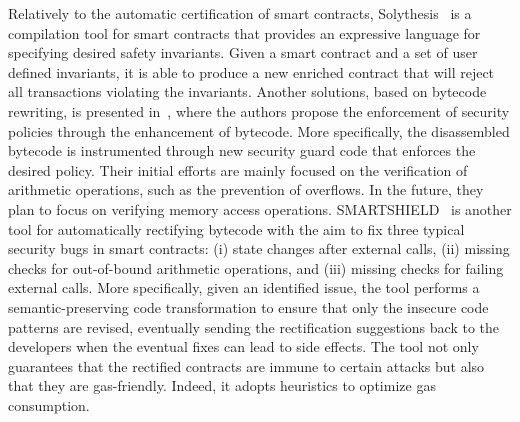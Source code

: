 Relatively to the automatic certification of smart contracts,
Solythesis~\cite{solythesis_solidity_validation} is a compilation tool for smart contracts
that provides an expressive language for specifying desired safety invariants.
Given a smart contract and a set of user defined invariants,
it is able to produce a new enriched contract that will reject all transactions
violating the invariants.
%
Another solutions, based on bytecode rewriting, is presented in~\cite{bytecode_rewriting},
where the authors propose the enforcement of security policies through the enhancement of bytecode.
More specifically, the disassembled bytecode is instrumented through new security guard code
that enforces the desired policy. Their initial efforts are mainly focused on the verification
of arithmetic operations, such as the prevention of overflows. In the future, they plan to focus on
verifying memory access operations.
%
SMARTSHIELD~\cite{smartshield} is another tool for automatically
rectifying bytecode with the aim to fix three typical security bugs in smart contracts:
(i) state changes after external calls, (ii) missing checks for out-of-bound arithmetic operations,
and (iii) missing checks for failing external calls. More specifically, given an identified issue,
the tool performs a semantic-preserving code transformation to ensure that only the insecure code
patterns are revised, eventually sending the rectification suggestions back to the developers
when the eventual fixes can lead to side effects. The tool not only guarantees that the rectified
contracts are immune to certain attacks but also that they are gas-friendly.
Indeed, it adopts heuristics to optimize gas consumption. 



